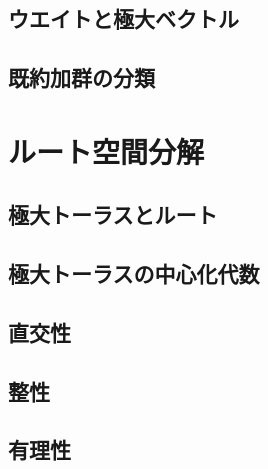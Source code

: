 \documentclass[rep_main]{subfiles}
\begin{document}
\subsection{ウエイトと極大ベクトル}
\subsection{既約加群の分類}

\section{ルート空間分解}

\subsection{極大トーラスとルート}
\subsection{極大トーラスの中心化代数}
\subsection{直交性}
\subsection{整性}
\subsection{有理性}
\end{document}
